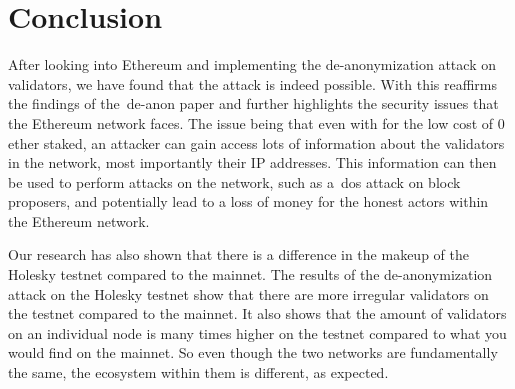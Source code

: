 

\section{Conclusion}\label{sec:conclusion}
After looking into Ethereum and implementing the de-anonymization attack on validators, we have found that the attack is indeed possible.
With this reaffirms the findings of the~\gls{de-anon paper} and further highlights the security issues that the Ethereum network faces.
The issue being that even with for the low cost of 0 ether staked, an attacker can gain access lots of information about the validators in the network, most importantly their IP addresses.
This information can then be used to perform attacks on the network, such as a~\gls{dos} attack on block proposers, and potentially lead to a loss of money for the honest actors within the Ethereum network.


Our research has also shown that there is a difference in the makeup of the Holesky testnet compared to the mainnet.
The results of the de-anonymization attack on the Holesky testnet show that there are more irregular validators on the testnet compared to the mainnet.
It also shows that the amount of validators on an individual node is many times higher on the testnet compared to what you would find on the mainnet.
So even though the two networks are fundamentally the same, the ecosystem within them is different, as expected.
